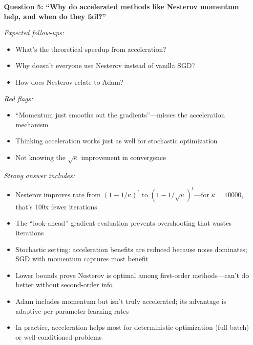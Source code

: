 \documentclass[../../main.tex]{subfiles}
\begin{document}
\begin{interviewquestions}
\textbf{Question 5: ``Why do accelerated methods like Nesterov momentum help, and when do they fail?''}

\textit{Expected follow-ups:}
\begin{itemize}
    \item What's the theoretical speedup from acceleration?
    \item Why doesn't everyone use Nesterov instead of vanilla SGD?
    \item How does Nesterov relate to Adam?
\end{itemize}

\textit{Red flags:}
\begin{itemize}
    \item ``Momentum just smooths out the gradients''---misses the acceleration mechanism
    \item Thinking acceleration works just as well for stochastic optimization
    \item Not knowing the $\sqrt{\kappa}$ improvement in convergence
\end{itemize}

\textit{Strong answer includes:}
\begin{itemize}
    \item Nesterov improves rate from $(1-1/\kappa)^t$ to $(1-1/\sqrt{\kappa})^t$---for $\kappa=10000$, that's 100x fewer iterations
    \item The ``look-ahead'' gradient evaluation prevents overshooting that wastes iterations
    \item Stochastic setting: acceleration benefits are reduced because noise dominates; SGD with momentum captures most benefit
    \item Lower bounds prove Nesterov is optimal among first-order methods---can't do better without second-order info
    \item Adam includes momentum but isn't truly accelerated; its advantage is adaptive per-parameter learning rates
    \item In practice, acceleration helps most for deterministic optimization (full batch) or well-conditioned problems
\end{itemize}

\end{interviewquestions}
\end{document}
